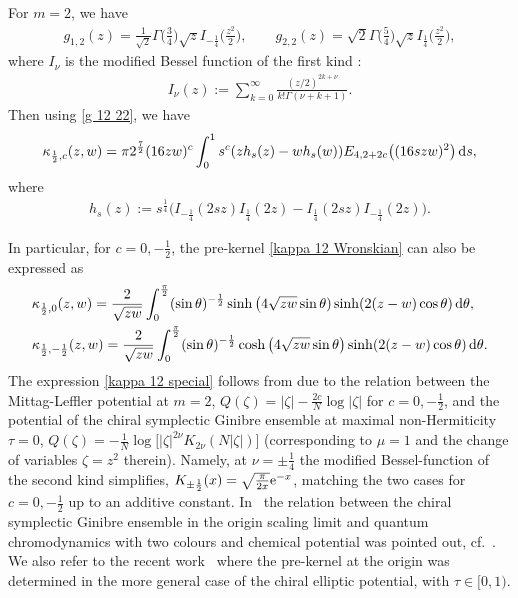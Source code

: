 \documentclass[pdftex]{sigma}
\numberwithin{equation}{section}
\newcommand{\1}{\chi}
\begin{document}
\begin{Example}[$\lambda=\frac12$] For $m=2$, we have
	\begin{gather}\label{g 12 22}
		g_{1,2}(z)=\tfrac{1}{\sqrt{2}}\Gamma\big(\tfrac34\big) \sqrt{z} I_{-\frac14}\big(\tfrac{z^2}{2}\big), \qquad g_{2,2}(z)=\sqrt{2} \Gamma\big(\tfrac54\big) \sqrt{z} I_{\frac14} \big( \tfrac{z^2}{2} \big),
	\end{gather}
	where $I_\nu$ is the modified Bessel function of the first kind \cite[Chapter~10]{olver2010nist}:
	\begin{gather*}
		I_\nu(z):=\sum_{k=0}^\infty \frac{(z/2)^{2k+\nu}}{k! \Gamma(\nu+k+1)}.
	\end{gather*}
	Then using \eqref{g 12 22}, we have
	\begin{gather} \label{kappa 12 Wronskian}
		\kappa_{\frac12,c}(z,w)=\pi 2^{\frac72} (16zw)^{c}
		\int_0^1 s^{c} (z h_s(z)-wh_s(w)) E_{4,2+2c}\big((16szw)^2\big) \,{\rm d}s,	
	\end{gather}
	where
	\begin{gather*}
		h_s(z):= s^{\frac14} \big( I_{-\frac14}(2sz)I_{\frac14}(2z) - I_{\frac14}(2sz) I_{-\frac14}(2z) \big).
	\end{gather*}
	
	In particular, for $c =0,-\frac12$, the pre-kernel \eqref{kappa 12 Wronskian} can also be expressed as
	\begin{gather}
	\begin{split}
& \kappa_{\frac12,0}(z,w)= \frac{2}{\sqrt{z w}} \int_{0}^{\frac{\pi}{2}} (\sin \theta)^{-\frac12} \sinh\big( 4 \sqrt{zw} \sin\theta) \sinh( 2 (z-w) \cos\theta ) \, {\rm d}\theta,
		\\
& \kappa_{\frac12,-\frac12}(z,w)= \frac{2}{\sqrt{z w}} \int_{0}^{\frac{\pi}{2}} (\sin \theta)^{-\frac12} \cosh\big( 4 \sqrt{zw} \sin\theta\big) \sinh( 2 (z-w) \cos\theta ) \, {\rm d}\theta.
	\end{split} \label{kappa 12 special}
	\end{gather}
The expression \eqref{kappa 12 special} follows from \cite[Appendix~B]{MR2180006} due to the relation between the Mittag-Leffler potential at $m=2$, $Q(\zeta)=|\zeta|-\frac{2c}{N}\log|\zeta|$ for $c=0,-\frac12$, and the potential of the chiral symplectic Ginibre ensemble at maximal non-Hermiticity $\tau=0$, $Q(\zeta)=-\frac{1}{N}\log \big[|\zeta|^{2\nu}K_{2\nu}(N|\zeta|)\big]$ (corresponding to $\mu=1$ and the change of variables $\zeta=z^2$ therein). Namely, at $\nu=\pm\frac14$ the modified Bessel-function of the second kind simplifies, $K_{\pm\frac12}(x)=\sqrt{\frac{\pi}{2x}}{\rm e}^{-x}$, matching the two cases for $c=0,-\frac12$ up to an additive constant. In~\cite{MR2180006} the relation between the chiral symplectic Ginibre ensemble in the origin scaling limit and quantum chromodynamics with two colours and chemical potential was pointed out, cf.~\cite{ABi06}.
We also refer to the recent work~\cite{akemann2021skew} where the pre-kernel at the origin was determined in the more general case of the chiral elliptic potential, with $\tau \in [0,1)$.
	

\end{Example}
\end{document}

